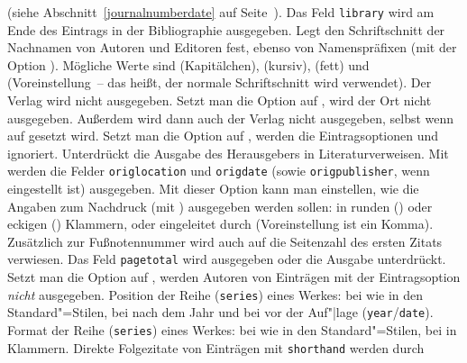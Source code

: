 \documentclass[ngerman]{scrartcl}
\begin{document}
	  (siehe Abschnitt~\ref{journalnumberdate} auf
	  Seite~\pageref{journalnumberdate}).
	  Das Feld \texttt{library} wird am Ende des Eintrags in der Bibliographie 
	  ausgegeben.
	  Legt den Schriftschnitt der Nachnamen von Autoren und Editoren fest, 
	  ebenso von Namenspräfixen (mit der Option ).
	  Mögliche Werte sind  (Kapitälchen),  (kursiv),
	   (fett) und  (Voreinstellung~-- das heißt,
	  der normale Schriftschnitt wird verwendet).
	  Der Verlag wird nicht ausgegeben.
	  Setzt man die Option auf , wird der Ort nicht ausgegeben. 
	  Außerdem wird dann auch der Verlag nicht ausgegeben,
	  selbst wenn  auf  gesetzt wird.
	  Setzt man die Option auf , werden die Eintragsoptionen
	   und  ignoriert.
	  Unterdrückt die Ausgabe des Herausgebers in Literaturverweisen.
	  Mit  werden die Felder \texttt{origlocation} und 
	  \texttt{origdate} (sowie \texttt{origpublisher}, wenn
	   eingestellt ist) ausgegeben.
	  Mit dieser Option kann man einstellen, wie die Angaben zum Nachdruck (mit 
	  ) ausgegeben werden sollen: in runden
	  () oder eckigen () Klammern, oder eingeleitet 
	  durch  (Voreinstellung ist ein Komma).
	  Zusätzlich zur Fußnotennummer wird auch auf die Seitenzahl des ersten Zitats
	  verwiesen.
	  Das Feld \texttt{pagetotal} wird ausgegeben oder die Ausgabe unterdrückt.
	  Setzt man die Option auf , werden Autoren von Einträgen mit der Eintragsoption
		 \emph{nicht} ausgegeben.
	  Position der Reihe (\texttt{series}) eines Werkes: bei  wie
	  in den Standard"=Stilen, bei  nach dem Jahr und bei  vor der Auf"|lage
	  (\texttt{year}\slash \texttt{date}).
    Format der Reihe (\texttt{series}) eines Werkes: bei  wie in
    den Standard"=Stilen, bei  in Klammern.
	  Direkte Folgezitate von Einträgen mit \texttt{shorthand} werden durch 
\end{document}
